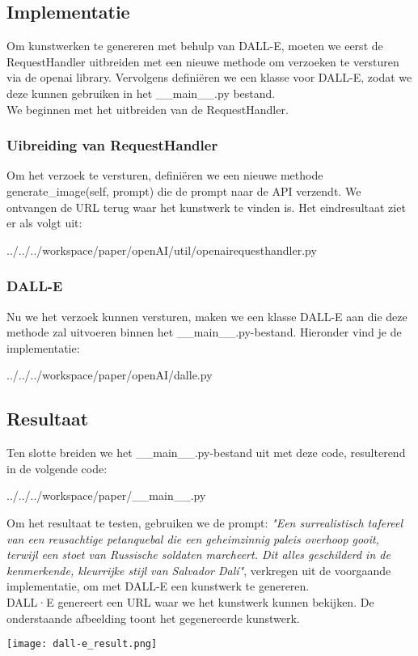 \subsection{Implementatie}
Om kunstwerken te genereren met behulp van DALL-E, moeten we eerst de RequestHandler uitbreiden met een nieuwe methode om verzoeken te versturen via de openai library. Vervolgens definiëren we een klasse voor DALL-E, zodat we deze kunnen gebruiken in het 
\_\_main\_\_.py bestand. \\

We beginnen met het uitbreiden van de RequestHandler.

\subsubsection{Uibreiding van RequestHandler}
Om het verzoek te versturen, definiëren we een nieuwe methode generate\_image(self, prompt) die de prompt naar de API verzendt. We ontvangen de URL terug waar het kunstwerk te vinden is. Het eindresultaat ziet er als volgt uit:
\begin{pythoncode}{../../../workspace/paper/openAI/util/openairequesthandler.py}
\end{pythoncode}

\subsubsection{DALL-E}
Nu we het verzoek kunnen versturen, maken we een klasse DALL-E aan die deze methode zal uitvoeren binnen het  \_\_main\_\_.py-bestand. Hieronder vind je de implementatie:
\begin{pythoncode}{../../../workspace/paper/openAI/dalle.py}
\end{pythoncode}
    
\subsection{Resultaat}
Ten slotte breiden we het \_\_main\_\_.py-bestand uit met deze code, resulterend in de volgende code:
\begin{pythoncode}{../../../workspace/paper/__main__.py}
\end{pythoncode}
Om het resultaat te testen, gebruiken we de prompt: \emph{"Een surrealistisch tafereel van een reusachtige petanquebal die een geheimzinnig paleis overhoop gooit, terwijl een stoet van Russische soldaten marcheert. Dit alles geschilderd in de kenmerkende, kleurrijke stijl van Salvador Dalí"}, verkregen uit de voorgaande implementatie, om met DALL-E een kunstwerk te genereren. \\

DALL·E genereert een URL waar we het kunstwerk kunnen bekijken. De onderstaande afbeelding toont het gegenereerde kunstwerk.

\begin{center}
    \texttt{[image: dall-e\_result.png]}
    \label{fig:dall-e_result}
\end{center}
